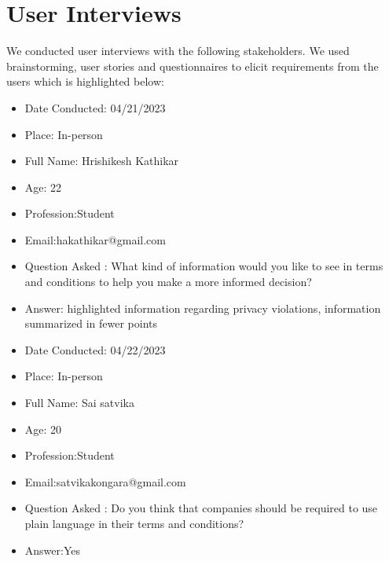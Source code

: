     
\section{ User Interviews \cite{DMuresanReqelicitation} \label{Section::User Interviews} }
We conducted user interviews with the following stakeholders. We used brainstorming, user stories and questionnaires to elicit requirements from the users which is highlighted below: 

\begin{itemize}
\item Date Conducted: 04/21/2023
\item Place: In-person
    \item Full Name: Hrishikesh Kathikar

    \item Age: 22

    \item Profession:Student 

    \item Email:hakathikar@gmail.com

    \item Question Asked : What kind of information would you like to see in terms and conditions to help you make a more informed decision?

    \item Answer: highlighted information regarding privacy violations, information summarized in fewer points
\end{itemize}
\begin{itemize}
\item Date Conducted: 04/22/2023
\item Place: In-person
    \item Full Name: Sai satvika

    \item Age: 20

    \item Profession:Student 

    \item Email:satvikakongara@gmail.com

    \item Question Asked : Do you think that companies should be required to use plain language in their terms and conditions?

    \item Answer:Yes 
\end{itemize}



